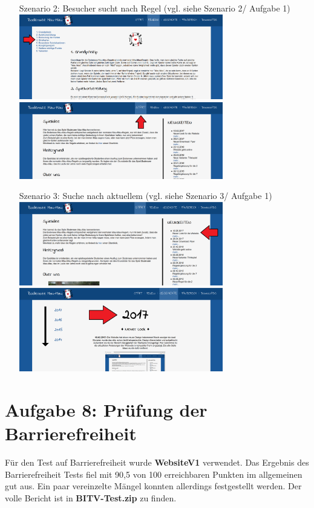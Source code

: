 \documentclass{scrartcl}
\begin{document}
\begin{enumerate}
\begin{itemize}
\item[Szenario 2:]
Besucher sucht nach Regel (vgl. siehe Szenario 2/ Aufgabe 1) \\
\includegraphics[width=0.7\textwidth]{screenshot_7_2_1.png} \\
\includegraphics[width=0.7\textwidth]{screenshot_7_2_2.png} 
\item[Szenario 3:]
Suche nach aktuellem (vgl. siehe Szenario 3/ Aufgabe 1) \\
\includegraphics[width=0.7\textwidth]{screenshot_7_3_1.png} \\
\includegraphics[width=0.7\textwidth]{screenshot_7_3_2.png}
\end{itemize}


\end{enumerate}
\section*{Aufgabe 8: Prüfung der Barrierefreiheit}
Für den Test auf Barrierefreiheit wurde \textbf{WebsiteV1} verwendet.
Das Ergebnis des Barrierefreiheit Tests fiel mit 90,5 von 100 erreichbaren Punkten im allgemeinen gut aus. Ein paar vereinzelte Mängel konnten allerdings festgestellt werden. Der volle Bericht ist in \textbf{BITV-Test.zip} zu finden.
\end{document}
